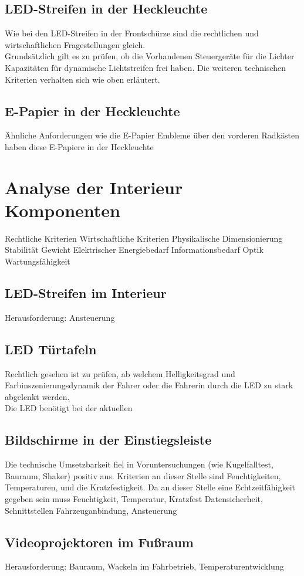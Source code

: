 \subsection{LED-Streifen in der Heckleuchte}
Wie bei den LED-Streifen in der Frontschürze sind die rechtlichen und wirtschaftlichen Fragestellungen gleich. \\
Grundsätzlich gilt es zu prüfen, ob die Vorhandenen Steuergeräte für die Lichter Kapazitäten für dynamische Lichtstreifen frei haben.
Die weiteren technischen Kriterien verhalten sich wie oben erläutert.
\subsection{E-Papier in der Heckleuchte}
Ähnliche Anforderungen wie die E-Papier Embleme über den vorderen Radkästen haben diese E-Papiere in der Heckleuchte
\section{Analyse der Interieur Komponenten}
Rechtliche Kriterien
Wirtschaftliche Kriterien
Physikalische Dimensionierung
Stabilität
Gewicht
Elektrischer Energiebedarf
Informationsbedarf
Optik
Wartungsfähigkeit
\subsection{LED-Streifen im Interieur}
Herausforderung:
Ansteuerung
\subsection{LED Türtafeln}
Rechtlich gesehen ist zu prüfen, ab welchem Helligkeitsgrad und Farbinszenierungsdynamik der Fahrer oder die Fahrerin durch die LED zu stark abgelenkt werden.\\
Die LED benötigt bei der aktuellen 
\subsection{Bildschirme in der Einstiegsleiste}

Die technische Umsetzbarkeit fiel in Voruntersuchungen (wie Kugelfalltest, Bauraum, Shaker) positiv aus.
Kriterien an dieser Stelle sind Feuchtigkeiten, Temperaturen, und die Kratzfestigkeit.
Da an dieser Stelle eine Echtzeitfähigkeit gegeben sein muss
Feuchtigkeit, Temperatur, Kratzfest
Datensicherheit, Schnittstellen
Fahrzeuganbindung, Ansteuerung

\subsection{Videoprojektoren im Fußraum}
Herausforderung:
Bauraum, Wackeln im Fahrbetrieb, Temperaturentwicklung
